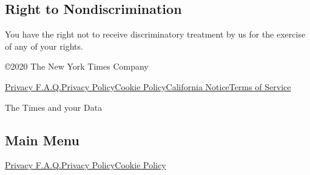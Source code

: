 \hypertarget{right-to-nondiscrimination}{%
\subsection{Right to
Nondiscrimination}\label{right-to-nondiscrimination}}

You have the right not to receive discriminatory treatment by us for the
exercise of any of your rights.

©2020 The New York Times Company

\href{/privacy}{Privacy F.A.Q.}\href{/privacy/privacy-policy}{Privacy
Policy}\href{/privacy/cookie-policy}{Cookie
Policy}\href{/privacy/california-notice}{California
Notice}\href{https://help.nytimes3xbfgragh.onion/hc/en-us/articles/115014893428-Terms-of-service}{Terms
of Service}

The Times and your Data

\hypertarget{main-menu}{%
\subsection{Main Menu}\label{main-menu}}

\href{/privacy}{Privacy F.A.Q.}\href{/privacy/privacy-policy}{Privacy
Policy}\href{/privacy/cookie-policy}{Cookie Policy}
